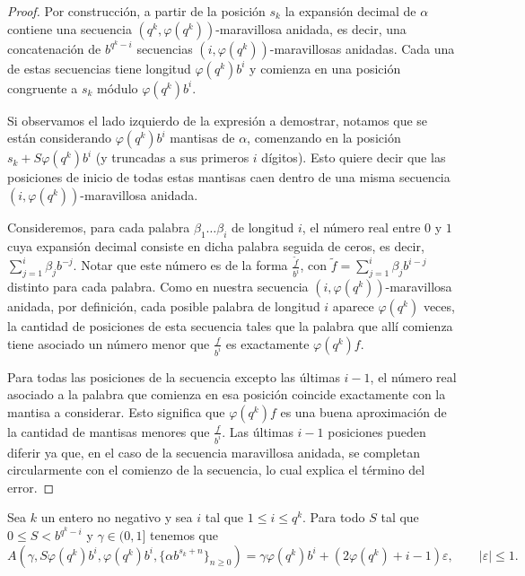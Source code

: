 \begin{proof}
Por construcción, a partir de la posición $s_k$ la expansión decimal de
$\alpha$ contiene una secuencia $(q^k, \varphi(q^k))$-maravillosa anidada,
es decir, una concatenación de $b^{q^k-i}$ secuencias
$(i, \varphi(q^k))$-maravillosas anidadas. Cada una de estas secuencias tiene
longitud $\varphi(q^k)b^{i}$ y comienza en una posición congruente a $s_k$
módulo $\varphi(q^k)b^{i}$.

Si observamos el lado izquierdo de la expresión a demostrar,
notamos que se están considerando $\varphi(q^k)b^i$ mantisas de $\alpha$,
comenzando en la posición $s_k + S\varphi(q^k)b^i$
(y truncadas a sus primeros $i$ dígitos).
Esto quiere decir que las posiciones de inicio de todas estas mantisas
caen dentro de una misma secuencia $(i, \varphi(q^k))$-maravillosa anidada.

Consideremos, para cada palabra $\beta_1\dots\beta_i$ de
longitud $i$, el número real entre $0$ y $1$ cuya expansión decimal consiste
en dicha palabra seguida de ceros, es decir, $\sum_{j=1}^{i} \beta_{j} b^{-j}$.
Notar que este número es de la forma $\frac{\tilde{f}}{b^i}$, con
$\tilde{f} = \sum_{j=1}^{i} \beta_{j} b^{i-j}$ distinto para cada palabra.
Como en nuestra secuencia $(i, \varphi(q^k))$-maravillosa anidada, por
definición, cada posible palabra de longitud $i$ aparece $\varphi(q^k)$ veces,
la cantidad de posiciones de esta secuencia tales que la palabra que allí
comienza tiene asociado un número menor que $\frac{f}{b^i}$ es exactamente
$\varphi(q^k)f$.

Para todas las posiciones de la secuencia excepto las últimas $i - 1$,
el número real asociado a la palabra que comienza en esa posición coincide
exactamente con la mantisa a considerar. Esto significa que $\varphi(q^k)f$ es
una buena aproximación de la cantidad de mantisas menores que $\frac{f}{b^i}$.
Las últimas $i - 1$ posiciones pueden diferir ya que, en el caso de la
secuencia maravillosa anidada, se completan circularmente con el comienzo de la
secuencia, lo cual explica el término del error.
\end{proof}

\begin{lemma}
	\label{lemma:discrepancy-2}
	Sea $k$ un entero no negativo y sea $i$ tal que $1 \leq i \leq q^k$.
	Para todo $S$ tal que $0 \leq S < b^{q^k-i}$ y
	$\gamma \in (0, 1]$ tenemos que
	\[
		A\left(\gamma, S \varphi(q^k) b^i, \varphi(q^k) b^i,
			\lbrace \alpha b^{s_k + n} \rbrace_{n\geq0} \right)
		= \gamma\varphi(q^k)b^i + (2\varphi(q^k) + i - 1)\varepsilon,
			\qquad \vert\varepsilon\vert \leq 1.
	\]
\end{lemma}


